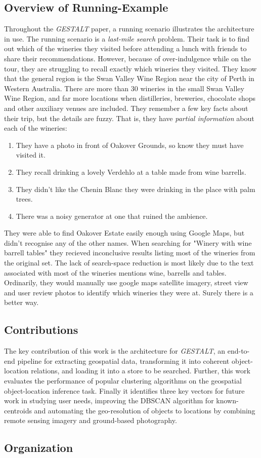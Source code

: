 \subsection{Overview of Running-Example}
Throughout the \textit{GESTALT} paper, a running scenario illustrates the architecture in use. 
The running scenario is a \textit{last-mile search} problem. Their task is to find out which of the wineries they visited before attending a lunch with friends to share their recommendations. 
However, because of over-indulgence while on the tour, they are struggling to recall exactly which wineries they visited.
They know that the general region is the Swan Valley Wine Region near the city of Perth in Western Australia. There are more than 30 wineries in the small Swan Valley Wine Region, and far more locations when distilleries, breweries, chocolate shops and other auxiliary venues are included. 
They remember a few key facts about their trip, but the details are fuzzy. That is, they have \textit{partial information} about each of the wineries:
\begin{enumerate}
	\item They have a photo in front of Oakover Grounds, so know they must have visited it. 
	\item They recall drinking a lovely Verdehlo at a table made from wine barrells. 
	\item They didn't like the Chenin Blanc they were drinking in the place with palm trees.
	\item There was a noisy generator at one that ruined the ambience. 
\end{enumerate}	
They were able to find Oakover Estate easily enough using Google Maps, but didn't recognise any of the other names. 
When searching for "Winery with wine barrell tables" they recieved inconclusive results listing most of the wineries from the original set. The lack of search-space reduction is most likely due to the text associated with most of the wineries mentions wine, barrells and tables. 
Ordinarily, they would manually use google maps satellite imagery, street view and user review photos to identify which wineries they were at. 
Surely there is a better way.

\subsection{Contributions}
The key contribution of this work is the architecture for \textit{GESTALT}, an end-to-end pipeline for extracting geospatial data, transforming it into coherent object-location relations, and loading it into a store to be searched. Further, this work evaluates the performance of popular clustering algorithms on the geospatial object-location inference task. Finally it identifies three key vectors for future work in studying user needs, improving the DBSCAN algorithm for known-centroids and automating the geo-resolution of objects to locations by combining remote sensing imagery and ground-based photography. 

\subsection{Organization}

